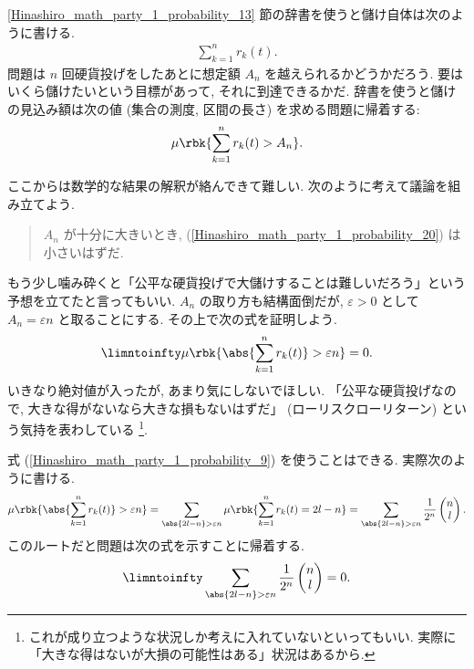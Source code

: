 \documentclass[openany, a4paper, oneside]{jsbook}
\begin{document}
\ref{Hinashiro_math_party_1_probability_13} 節の辞書を使うと儲け自体は次のように書ける.
\begin{align}
 \sum_{k=1}^n r_k (t).
\end{align}
問題は $n$ 回硬貨投げをしたあとに想定額 $A_n$ を越えられるかどうかだろう.
要はいくら儲けたいという目標があって, それに到達できるかだ.
辞書を使うと儲けの見込み額は次の値 (集合の測度, 区間の長さ) を求める問題に帰着する:
\begin{align}
 \mu \rbk{\sum_{k=1}^n r_k (t) > A_n}. \label{Hinashiro_math_party_1_probability_20}
\end{align}

ここからは数学的な結果の解釈が絡んできて難しい.
次のように考えて議論を組み立てよう.
\begin{quote}
$A_n$ が十分に大きいとき, (\ref{Hinashiro_math_party_1_probability_20}) は小さいはずだ.
\end{quote}
もう少し噛み砕くと「公平な硬貨投げで大儲けすることは難しいだろう」という予想を立てたと言ってもいい.
$A_n$ の取り方も結構面倒だが, $\varepsilon > 0$ として $A_n = \varepsilon n$ と取ることにする.
その上で次の式を証明しよう.
\begin{align}
 \limntoinfty \mu \rbk{\abs{\sum_{k=1}^n r_k (t)} > \varepsilon n} = 0. \label{Hinashiro_math_party_1_probability_8}
\end{align}
いきなり絶対値が入ったが, あまり気にしないでほしい.
「公平な硬貨投げなので, 大きな得がないなら大きな損もないはずだ」 (ローリスクローリターン) という気持を表わしている \footnote{これが成り立つような状況しか考えに入れていないといってもいい.
実際に「大きな得はないが大損の可能性はある」状況はあるから.}.

式 (\ref{Hinashiro_math_party_1_probability_9}) を使うことはできる.
実際次のように書ける.
\begin{align}
 \mu \rbk{\abs{\sum_{k=1}^n r_k (t)} > \varepsilon n}
 =
 \sum_{\abs{2l - n} > \varepsilon n} \mu \rbk{\sum_{k=1}^n r_k (t) = 2l - n}
 =
 \sum_{\abs{2l - n} > \varepsilon n} \frac{1}{2^n}
 \begin{pmatrix}
  n \\
  l
 \end{pmatrix}.
\end{align}
このルートだと問題は次の式を示すことに帰着する.
\begin{align}
 \limntoinfty \sum_{\abs{2l - n} > \varepsilon n} \frac{1}{2^n}
 \begin{pmatrix}
  n \\
  l
 \end{pmatrix}
 = 0. \label{Hinashiro_math_party_1_probability_12}
\end{align}
\end{document}
